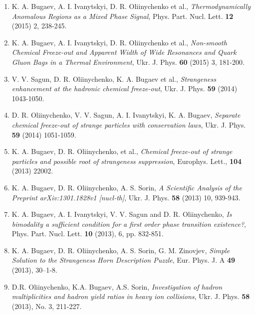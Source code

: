 \begin{lebenslauf}
\begin{enumerate}
{                Collisions Using Coarse-grained Molecular Dynamics},
          Phys. Rev. C \textbf{ 91} (2015) 2, 024906.
    \item K. A. Bugaev, A. I. Ivanytskyi, D. R. Oliinychenko et al.,
          \emph{Thermodynamically Anomalous Regions as a Mixed Phase Signal},
          Phys. Part. Nucl. Lett. \textbf{ 12} (2015) 2, 238-245.
    \item K. A. Bugaev, A. I. Ivanytskyi, D. R. Oliinychenko et al.,
          \emph{Non-smooth Chemical Freeze-out and Apparent Width of Wide Resonances and Quark
                Gluon Bags in a Thermal Environment},
          Ukr. J. Phys. \textbf{ 60} (2015) 3, 181-200.
    \item V. V. Sagun, D. R. Oliinychenko, K. A. Bugaev et al.,
          \emph{Strangeness enhancement at the hadronic chemical freeze-out},
          Ukr. J. Phys. \textbf{ 59} (2014) 1043-1050.
    \item D. R. Oliinychenko, V. V. Sagun, A. I. Ivanytskyi, K. A. Bugaev,
          \emph{Separate chemical freeze-out of strange particles with conservation laws},
          Ukr. J. Phys. \textbf{ 59} (2014) 1051-1059.
    \item K. A. Bugaev, D. R. Oliinychenko, et al.,
    	  \emph{Chemical freeze-out of strange particles and possible root of strangeness
                suppression},
          Europhys. Lett., \textbf{ 104} (2013) 22002.
    \item K. A. Bugaev, D. R. Oliinychenko, A. S. Sorin,
          \emph{A Scientific Analysis of the Preprint arXiv:1301.1828v1  [nucl-th]},
          Ukr. J. Phys. \textbf{ 58} (2013) 10, 939-943.
    \item K. A. Bugaev, A. I. Ivanytskyi, V. V. Sagun and D. R. Oliinychenko,
          \emph{ Is  bimodality a sufficient condition for a first order phase transition
                existence?},
          Phys.  Part. Nucl. Lett. \textbf{ 10} (2013), 6, pp. 832-851.
    \item K. A. Bugaev, D. R. Oliinychenko, A. S. Sorin, G. M. Zinovjev,
          \emph{Simple Solution to the Strangeness Horn Description Puzzle},
	      Eur. Phys. J. A \textbf{ 49} (2013), 30--1-8.
    \item D.R. Oliinychenko, K.A. Bugaev, A.S. Sorin,
          \emph{Investigation of hadron multiplicities and hadron yield ratios in heavy ion
                collisions},
	      Ukr. J. Phys. \textbf{ 58} (2013), No. 3, 211-227.
\end{enumerate}


\end{lebenslauf}
